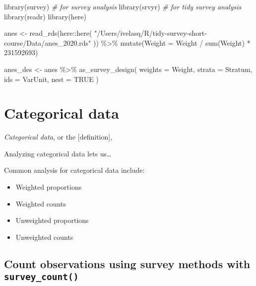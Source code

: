 \documentclass[
]{krantz}
\makeatletter
\newenvironment{Shaded}{\begin{snugshade}}{\end{snugshade}}
\newcommand{\AttributeTok}[1]{\textcolor[rgb]{0.61,0.61,0.61}{#1}}
\newcommand{\CommentTok}[1]{\textcolor[rgb]{0.37,0.37,0.37}{\textit{#1}}}
\newcommand{\ConstantTok}[1]{\textcolor[rgb]{0,0,0}{#1}}
\newcommand{\DecValTok}[1]{\textcolor[rgb]{0.06,0.06,0.06}{#1}}
\newcommand{\FunctionTok}[1]{\textcolor[rgb]{0,0,0}{#1}}
\newcommand{\NormalTok}[1]{#1}
\newcommand{\OtherTok}[1]{\textcolor[rgb]{0.37,0.37,0.37}{#1}}
\newcommand{\SpecialCharTok}[1]{\textcolor[rgb]{0,0,0}{#1}}
\newcommand{\StringTok}[1]{\textcolor[rgb]{0.5,0.5,0.5}{#1}}
\providecommand{\tightlist}{%
  \setlength{\itemsep}{0pt}\setlength{\parskip}{0pt}}
\newenvironment{kframe}{%
\medskip{}
\setlength{\fboxsep}{.8em}
 \def\at@end@of@kframe{}%
 \ifinner\ifhmode%
  \def\at@end@of@kframe{\end{minipage}}%
  \begin{minipage}{\columnwidth}%
 \fi\fi%
 \def\FrameCommand##1{\hskip\@totalleftmargin \hskip-\fboxsep
 \colorbox{shadecolor}{##1}\hskip-\fboxsep
     \hskip-\linewidth \hskip-\@totalleftmargin \hskip\columnwidth}%
 \MakeFramed {\advance\hsize-\width
   \@totalleftmargin\z@ \linewidth\hsize
   \@setminipage}}%
 {\par\unskip\endMakeFramed%
 \at@end@of@kframe}
\renewenvironment{Shaded}{\begin{kframe}}{\end{kframe}}
\makeatother
\begin{document}
\begin{Shaded}
\begin{Highlighting}[]
\FunctionTok{library}\NormalTok{(survey) }\CommentTok{\# for survey analysis}
\FunctionTok{library}\NormalTok{(srvyr) }\CommentTok{\# for tidy survey analysis}
\FunctionTok{library}\NormalTok{(readr)}
\FunctionTok{library}\NormalTok{(here)}

\NormalTok{anes }\OtherTok{\textless{}{-}}
  \FunctionTok{read\_rds}\NormalTok{(here}\SpecialCharTok{::}\FunctionTok{here}\NormalTok{(}
    \StringTok{"/Users/ivelasq/R/tidy{-}survey{-}short{-}course/Data/anes\_2020.rds"}
\NormalTok{  )) }\SpecialCharTok{\%\textgreater{}\%}
  \FunctionTok{mutate}\NormalTok{(}\AttributeTok{Weight =}\NormalTok{ Weight }\SpecialCharTok{/} \FunctionTok{sum}\NormalTok{(Weight) }\SpecialCharTok{*} \DecValTok{231592693}\NormalTok{)}

\NormalTok{anes\_des }\OtherTok{\textless{}{-}}\NormalTok{ anes }\SpecialCharTok{\%\textgreater{}\%}
  \FunctionTok{as\_survey\_design}\NormalTok{(}
    \AttributeTok{weights =}\NormalTok{ Weight,}
    \AttributeTok{strata =}\NormalTok{ Stratum,}
    \AttributeTok{ids =}\NormalTok{ VarUnit,}
    \AttributeTok{nest =} \ConstantTok{TRUE}
\NormalTok{  )}
\end{Highlighting}
\end{Shaded}

\hypertarget{categorical-data}{%
\section{Categorical data}\label{categorical-data}}

\emph{Categorical data}, or the {[}definition{]},

Analyzing categorical data lets us\ldots{}

Common analysis for categorical data include:

\begin{itemize}
\tightlist
\item
  Weighted proportions
\item
  Weighted counts
\item
  Unweighted proportions
\item
  Unweighted counts
\end{itemize}

\hypertarget{count-observations-using-survey-methods-with-survey_count}{%
\subsection{\texorpdfstring{Count observations using survey methods with \texttt{survey\_count()}}{Count observations using survey methods with survey\_count()}}\label{count-observations-using-survey-methods-with-survey_count}}
\end{document}
